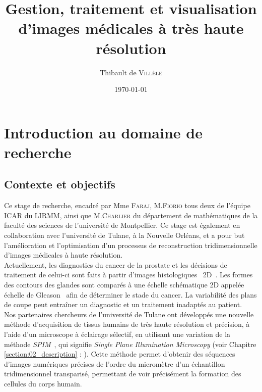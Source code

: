 \documentclass[utf8]{stageM2R}
\author{Thibault de \textsc{Villèle}}
\title{Gestion, traitement et visualisation d'images médicales à très haute résolution}
\date{\today}
\begin{document}
	\frontmatter \maketitle
	\cleardoublepage
	\tableofcontents \mainmatter

	\chapter{Introduction au domaine de recherche}\label{section:01_intro}
	{
		\section{Contexte et objectifs}\label{section:01_01_contexte}
		{
			Ce stage de recherche, encadré par Mme \textsc{Faraj}, M.\textsc{Fiorio} tous deux de l'équipe ICAR du LIRMM, ainsi que M.\textsc{Charlier} du département de mathématiques de la faculté des sciences de l'université de Montpellier. Ce stage est également en collaboration avec l'université de Tulane, à la Nouvelle Orléans, et a pour but l'amélioration et l'optimisation d'un processus de reconstruction tridimensionnelle d'images médicales à haute résolution.\\

			Actuellement, les diagnostics du cancer de la prostate et les décisions de traitement de celui-ci sont faits à partir d'images histologiques\footnotemark~ 2D~\cite{cite_gleason_use_in_histology_poster}. Les formes des contours des glandes sont comparés à une échelle schématique 2D appelée échelle de Gleason~\cite{cite_gleason_score} afin de déterminer le stade du cancer. La variabilité des plans de coupe peut entraîner un diagnostic et un traitement inadaptés au patient.
			\\

			Nos partenaires chercheurs de l'université de Tulane ont développés une nouvelle méthode d'acquisition de tissus humains de très haute résolution et précision, à l'aide d'un microscope à éclairage sélectif, en utilisant une variation de la méthode \textit{SPIM}~\cite{cite_spim_explication_original}, qui signifie \textit{Single Plane Illumination Microscopy} (voir Chapitre \ref{section:02_description} : ). Cette méthode permet d'obtenir des séquences d'images numériques précises de l'ordre du micromètre d'un échantillon tridimensionnel transparisé, permettant de voir précisément la formation des cellules du corps humain.\\

}}
\end{document}
